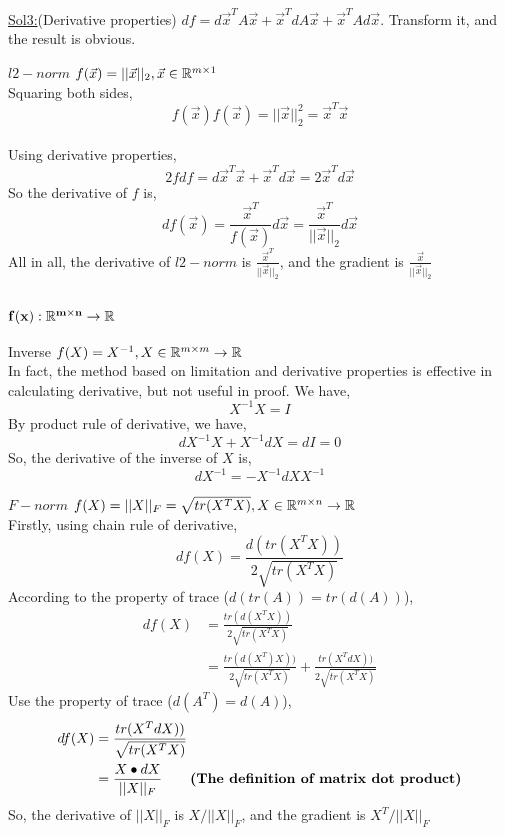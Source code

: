 \begin{Examples}{}{}
				\underline{Sol3:}(Derivative properties) $df=d\vec x^TA\vec x+\vec x^TdA\vec x+\vec x^TAd\vec x$. Transform it, and the result is obvious.
 			\end{Examples}
 		
 			\begin{Examples}{$l2-norm$}{}
 				$f(\vec x)=||\vec x||_2,\vec x\in\mathbb{R}^{m\times1}$\\
 				Squaring both sides,
 				$$f(\vec x)f(\vec x)=||\vec x||_2^2=\vec x^T\vec x$$ \\
 				Using derivative properties,
 				$$2fdf=d\vec x^T\vec x+\vec x^Td\vec x=2\vec x^Td\vec x$$
 				So the derivative of $f$ is,
 				$$
 				df(\vec x) = \frac{\vec x^T}{f(\vec x)}d\vec x=\frac{\vec x^T}{||\vec x||_2}d\vec x
 				$$
 				All in all, the derivative of $l2-norm$ is $\frac{\vec x^T}{||\vec x||_2}$, and the gradient is $\frac{\vec x}{||\vec x||_2}$
 			\end{Examples}
 		
		\subsubsection{$\mathbf{f(x):\mathbb{R}^{m\times n}\rightarrow\mathbb{R}}$}
			\begin{Examples}{Inverse}{}
				$f(X)=X^{-1},X\in\mathbb{R}^{m\times m}\rightarrow \mathbb{R}$\\
				In fact, the method based on limitation and derivative properties is effective in calculating derivative, but not useful in proof. We have,
				$$X^{-1}X=I$$
				By product rule of derivative, we have,
				$$dX^{-1}X+X^{-1}dX=dI=0$$
				So, the derivative of the inverse of $X$ is,
				$$dX^{-1}=-X^{-1}dXX^{-1}$$
			\end{Examples}
			
			\begin{Examples}{$F-norm$}{}
				$f(X)=||X||_F=\sqrt{tr(X^TX)},X\in\mathbb{R}^{m\times n}\rightarrow \mathbb{R}$\\
				Firstly, using chain rule of derivative,
				$$
				df(X) = \frac{d(tr(X^TX))}{2\sqrt{tr(X^TX)}}
				$$
				According to the property of trace ($d(tr(A))=tr(d(A))$),
				\begin{equation*}
				\begin{split}
				df(X) &= \frac{tr(d(X^TX))}{2\sqrt{tr(X^TX)}}\\
				&= \frac{tr(d(X^T)X))}{2\sqrt{tr(X^TX)}}+\frac{tr(X^TdX))}{2\sqrt{tr(X^TX)}}
				\end{split}
				\end{equation*}
				Use the property of trace ($d(A^T)=d(A)$),
				\begin{equation*}
					\begin{split}
						df(X) &= \frac{tr(X^TdX))}{\sqrt{tr(X^TX)}}\\
						&=\frac{X\bullet dX}{||X||_F} \quad \quad \text{\textbf{(The definition of matrix dot product)}}					
					\end{split}
				\end{equation*}
				So, the derivative of $||X||_F$ is $X/||X||_F$, and the gradient is $X^T/||X||_F$
			\end{Examples}
		
